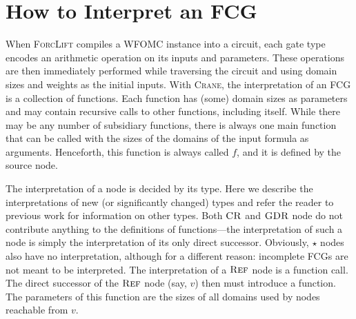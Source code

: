 \section{How to Interpret an FCG}\label{sec:interpret}

When \textsc{ForcLift} \citep{DBLP:conf/ijcai/BroeckTMDR11} compiles a WFOMC
instance into a circuit, each gate type encodes an arithmetic operation on its
inputs and parameters. These operations are then immediately performed while
traversing the circuit and using domain sizes and weights as the initial inputs.
With \textsc{Crane}, the interpretation of an FCG is a collection of functions.
Each function has (some) domain sizes as parameters and may contain recursive
calls to other functions, including itself. While there may be any number of
subsidiary functions, there is always one main function that can be called with
the sizes of the domains of the input formula as arguments. Henceforth, this
function is always called $f$, and it is defined by the source node.

The interpretation of a node is decided by its type. Here we describe the
interpretations of new (or significantly changed) types and refer the reader to
previous work \citep{DBLP:conf/ijcai/BroeckTMDR11} for information on other
types. Both $\operatorname{\textsc{CR}}$ and $\operatorname{\textsc{GDR}}$ node do not contribute anything to the definitions
of functions---the interpretation of such a node is simply the interpretation of
its only direct successor. Obviously, $\star$ nodes also have no interpretation,
although for a different reason: incomplete FCGs are not meant to be
interpreted. The interpretation of a $\operatorname{\textsc{Ref}}$ node is a function call. The direct
successor of the $\operatorname{\textsc{Ref}}$ node (say, $v$) then must introduce a function. The
parameters of this function are the sizes of all domains used by nodes reachable
from $v$.

